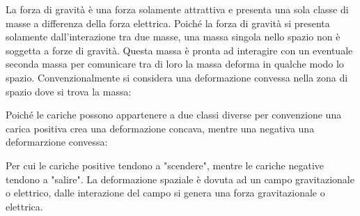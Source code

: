 \documentclass{article}
\numberwithin{equation}{subsection}
\begin{document}
La forza di gravità è una forza solamente attrattiva e presenta una sola classe di masse a differenza della forza elettrica. Poiché la forza di gravità si 
presenta solamente dall'interazione tra due masse, una massa singola nello spazio non è soggetta a forze di gravità. Questa massa è pronta ad interagire con un eventuale 
seconda massa per comunicare tra di loro la massa deforma in qualche modo lo spazio. Convenzionalmente si considera una deformazione convessa nella zona di spazio dove 
si trova la massa: 
\begin{center}
\end{center}

Poiché le cariche possono appartenere a due classi diverse per convenzione una carica positiva crea una deformazione concava, mentre una negativa una deformarzione convessa: 
\begin{center}
\end{center}
Per cui le cariche positive tendono a "scendere", mentre le cariche negative tendono a "salire". La deformazione spaziale è dovuta ad un campo gravitazionale o elettrico, 
dalle interazione del campo si genera una forza gravitazionale o elettrica. 
\end{document}
